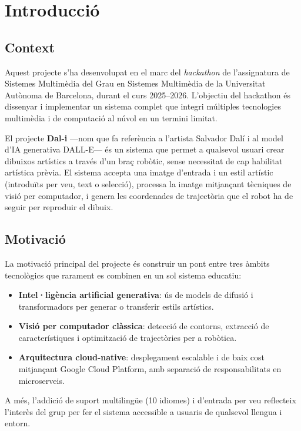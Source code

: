 \section{Introducció}

\subsection{Context}

Aquest projecte s'ha desenvolupat en el marc del \textit{hackathon} de l'assignatura de Sistemes Multimèdia del Grau en Sistemes Multimèdia de la Universitat Autònoma de Barcelona, durant el curs 2025--2026. L'objectiu del hackathon és dissenyar i implementar un sistema complet que integri múltiples tecnologies multimèdia i de computació al núvol en un termini limitat.

El projecte \textbf{Dal-i} —nom que fa referència a l'artista Salvador Dalí i al model d'IA generativa DALL-E— és un sistema que permet a qualsevol usuari crear dibuixos artístics a través d'un braç robòtic, sense necessitat de cap habilitat artística prèvia. El sistema accepta una imatge d'entrada i un estil artístic (introduïts per veu, text o selecció), processa la imatge mitjançant tècniques de visió per computador, i genera les coordenades de trajectòria que el robot ha de seguir per reproduir el dibuix.

\subsection{Motivació}

La motivació principal del projecte és construir un pont entre tres àmbits tecnològics que rarament es combinen en un sol sistema educatiu:

\begin{itemize}
  \item \textbf{Intel·ligència artificial generativa}: ús de models de difusió i transformadors per generar o transferir estils artístics.
  \item \textbf{Visió per computador clàssica}: detecció de contorns, extracció de característiques i optimització de trajectòries per a robòtica.
  \item \textbf{Arquitectura cloud-native}: desplegament escalable i de baix cost mitjançant Google Cloud Platform, amb separació de responsabilitats en microserveis.
\end{itemize}

A més, l'addició de suport multilingüe (10 idiomes) i d'entrada per veu reflecteix l'interès del grup per fer el sistema accessible a usuaris de qualsevol llengua i entorn.

